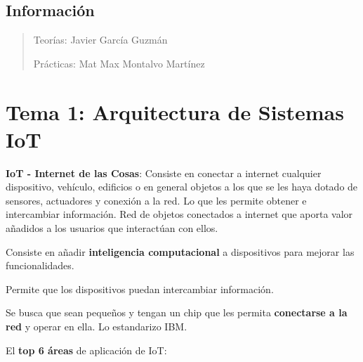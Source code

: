 \documentclass[12pt]{report} %
\begin{document}
\listoffigures
\thispagestyle{fancy}

\listoftables
\thispagestyle{fancy}

\clearpage
{} %




\section{Información}

\begin{quote}
Teorías: Javier García Guzmán

Prácticas: Mat Max Montalvo Martínez
\end{quote}

\chapter{Tema 1: Arquitectura de Sistemas
IoT}


\textbf{IoT - Internet de las Cosas}: Consiste en conectar a internet
cualquier dispositivo, vehículo, edificios o en general objetos a los
que se les haya dotado de sensores, actuadores y conexión a la red. Lo
que les permite obtener e intercambiar información. Red de objetos
conectados a internet que aporta valor añadidos a los usuarios que
interactúan con ellos.

Consiste en añadir \textbf{inteligencia computacional} a dispositivos
para mejorar las funcionalidades.

Permite que los dispositivos puedan intercambiar información.

Se busca que sean pequeños y tengan un chip que les permita
\textbf{conectarse a la red} y operar en ella. Lo estandarizo IBM.

El \textbf{top 6 áreas} de aplicación de IoT:
\end{document}

